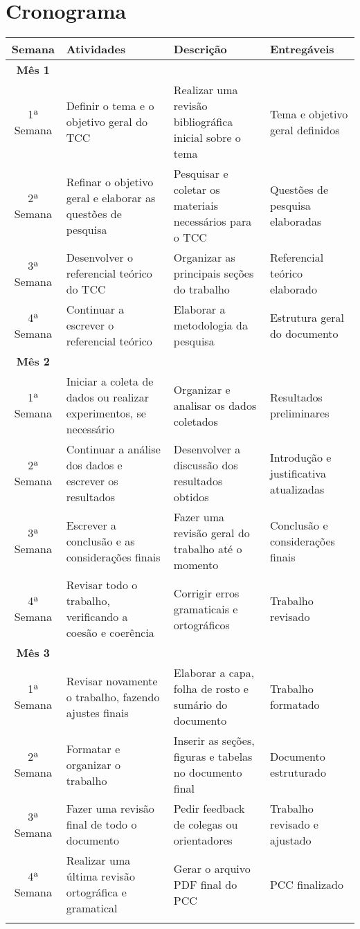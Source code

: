 \chapter{Cronograma}

\begin{tabular}{|c|p{4cm}|p{4cm}|p{5cm}|}
\hline
\textbf{Semana} & \textbf{Atividades} & \textbf{Descrição} & \textbf{Entregáveis} \\
\hline

\textbf{Mês 1} & & & \\
\hline
1ª Semana & Definir o tema e o objetivo geral do TCC & Realizar uma revisão bibliográfica inicial sobre o tema & Tema e objetivo geral definidos \\
\hline
2ª Semana & Refinar o objetivo geral e elaborar as questões de pesquisa & Pesquisar e coletar os materiais necessários para o TCC & Questões de pesquisa elaboradas \\
\hline
3ª Semana & Desenvolver o referencial teórico do TCC & Organizar as principais seções do trabalho & Referencial teórico elaborado \\
\hline
4ª Semana & Continuar a escrever o referencial teórico & Elaborar a metodologia da pesquisa & Estrutura geral do documento \\
\hline

\textbf{Mês 2} & & & \\
\hline
1ª Semana & Iniciar a coleta de dados ou realizar experimentos, se necessário & Organizar e analisar os dados coletados & Resultados preliminares \\
\hline
2ª Semana & Continuar a análise dos dados e escrever os resultados & Desenvolver a discussão dos resultados obtidos & Introdução e justificativa atualizadas \\
\hline
3ª Semana & Escrever a conclusão e as considerações finais & Fazer uma revisão geral do trabalho até o momento & Conclusão e considerações finais \\
\hline
4ª Semana & Revisar todo o trabalho, verificando a coesão e coerência & Corrigir erros gramaticais e ortográficos & Trabalho revisado \\
\hline
\textbf{Mês 3} & & & \\
\hline
1ª Semana & Revisar novamente o trabalho, fazendo ajustes finais & Elaborar a capa, folha de rosto e sumário do documento & Trabalho formatado \\
\hline
2ª Semana & Formatar e organizar o trabalho & Inserir as seções, figuras e tabelas no documento final & Documento estruturado \\
\hline
3ª Semana & Fazer uma revisão final de todo o documento & Pedir feedback de colegas ou orientadores & Trabalho revisado e ajustado \\
\hline
4ª Semana & Realizar uma última revisão ortográfica e gramatical & Gerar o arquivo PDF final do PCC & PCC finalizado \\
\hline
\\
\end{tabular}